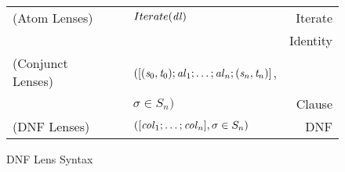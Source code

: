 \begin{figure}
\centering
\begin{tabular}{l@{\ }l@{\ }c@{\ }l@{\ }r}
(Atom Lenses) &\AtomLens{} & \GEq{} & $Iterate(\mathit{dl})$ & Iterate\\
& & & \GBar{} \IdentityLens{} & Identity\\
(Conjunct Lenses) &\ConjunctLens{} & \GEq{} &
$([(\mathit{s}_0,\mathit{t}_0);\mathit{al}_1;\ldots;\mathit{al}_n;(\mathit{s}_n,\mathit{t}_n)]$, &\\
& & & $\sigma \in S_n)$ & Clause\SubN{}\\
(DNF Lenses)& \DNFLens{} & \GEq{} & $([\mathit{col}_1;\ldots;\mathit{col}_n], \sigma \in S_n)$ & DNF\SubN{}\\
\end{tabular}
\caption{DNF Lens Syntax}
\label{fig:dnf-lens-syntax}
\end{figure}
